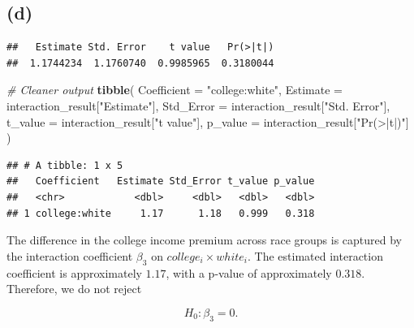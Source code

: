 \documentclass[
]{article}
\newenvironment{Shaded}{\begin{snugshade}}{\end{snugshade}}
\newcommand{\AttributeTok}[1]{\textcolor[rgb]{0.13,0.29,0.53}{#1}}
\newcommand{\CommentTok}[1]{\textcolor[rgb]{0.56,0.35,0.01}{\textit{#1}}}
\newcommand{\FunctionTok}[1]{\textcolor[rgb]{0.13,0.29,0.53}{\textbf{#1}}}
\newcommand{\NormalTok}[1]{#1}
\newcommand{\OtherTok}[1]{\textcolor[rgb]{0.56,0.35,0.01}{#1}}
\newcommand{\SpecialCharTok}[1]{\textcolor[rgb]{0.81,0.36,0.00}{\textbf{#1}}}
\newcommand{\StringTok}[1]{\textcolor[rgb]{0.31,0.60,0.02}{#1}}
\begin{document}
\subsection{(d)}\label{d-1}

\begin{Shaded}
\end{Shaded}

\begin{verbatim}
##   Estimate Std. Error    t value   Pr(>|t|) 
##  1.1744234  1.1760740  0.9985965  0.3180044
\end{verbatim}

\begin{Shaded}
\begin{Highlighting}[]
\CommentTok{\# Cleaner output}
\FunctionTok{tibble}\NormalTok{(}
  \AttributeTok{Coefficient =} \StringTok{"college:white"}\NormalTok{,}
  \AttributeTok{Estimate =}\NormalTok{ interaction\_result[}\StringTok{"Estimate"}\NormalTok{],}
  \AttributeTok{Std\_Error =}\NormalTok{ interaction\_result[}\StringTok{"Std. Error"}\NormalTok{],}
  \AttributeTok{t\_value =}\NormalTok{ interaction\_result[}\StringTok{"t value"}\NormalTok{],}
  \AttributeTok{p\_value =}\NormalTok{ interaction\_result[}\StringTok{"Pr(\textgreater{}|t|)"}\NormalTok{]}
\NormalTok{)}
\end{Highlighting}
\end{Shaded}

\begin{verbatim}
## # A tibble: 1 x 5
##   Coefficient   Estimate Std_Error t_value p_value
##   <chr>            <dbl>     <dbl>   <dbl>   <dbl>
## 1 college:white     1.17      1.18   0.999   0.318
\end{verbatim}

The difference in the college income premium across race groups is
captured by the interaction coefficient \(\beta_3\) on
\(college_i \times white_i\). The estimated interaction coefficient is
approximately \(1.17\), with a p-value of approximately \(0.318\).
Therefore, we do not reject

\[
H_0: \beta_3 = 0.
\]
\end{document}
